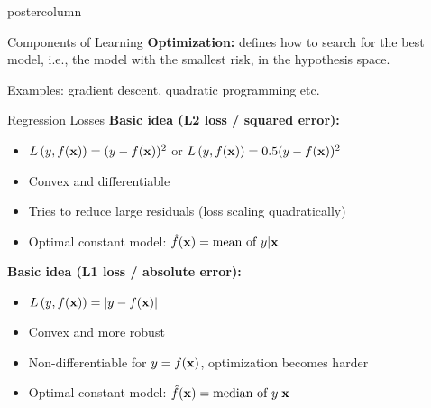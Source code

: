 \documentclass{beamer}
\begin{document}
\begin{frame}[fragile]{}
\begin{columns}
\begin{column}{.31\textwidth}
\begin{beamercolorbox}[center]{postercolumn}
\begin{minipage}{.98\textwidth}
{\begin{myblock}{Components of Learning}
          \textbf{Optimization: } defines how to search for the best model, i.e., the model with the smallest {risk}, in the hypothesis space.
          
          \hspace*{1ex} Examples: gradient descent, quadratic programming etc.
        
            
          \end{myblock}
          \begin{myblock}{Regression Losses}
			        \textbf{Basic idea (L2 loss / squared error):} 
						\begin{itemize}    
						  \setlength{\itemindent}{+.3in}
              \item $L\left(y, f(\mathbf{x})\right) = (y-f(\mathbf{x}))^2$ or $L\left(y, f(\mathbf{x})\right) = 0.5 (y-f(\mathbf{x}))^2$
              \item Convex and differentiable
              \item Tries to reduce large residuals (loss scaling quadratically)
              \item Optimal constant model: $\hat{f}(\mathbf{x}) = \text{mean of } y | \mathbf{x}$
            \end{itemize}

            \vspace*{1ex}

            
              \textbf{Basic idea (L1 loss / absolute error):} 
            \begin{itemize}     \setlength{\itemindent}{+.3in}
              \item $L\left(y, f(\mathbf{x})\right) = |y-f(\mathbf{x})|$
              \item Convex and more robust
              \item Non-differentiable for $y = f(\mathbf{x})$, optimization becomes harder
              \item Optimal constant model: $\hat{f}(\mathbf{x}) = \text{median of } y | \mathbf{x}$      
            \end{itemize}
          \end{myblock}

}
\end{minipage}
\end{beamercolorbox}
\end{column}
\end{columns}
\end{frame}
\end{document}
